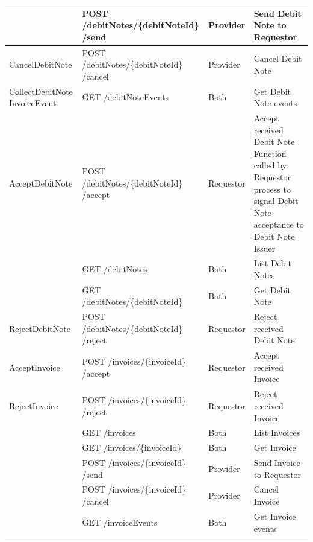 \begin{enumerate}
\begin{enumerate}
\begin{table}
\begin{center}
\begin{tabular}{|p{3cm}|p{7cm}|p{1.5cm}|p{4cm}|}
						& 	POST /debitNotes/\{debitNoteId\} /send		&	Provider 	&	Send Debit Note to Requestor \\
\hline

CancelDebitNote			&	POST /debitNotes/\{debitNoteId\} /cancel	&	Provider	&	Cancel Debit Note \\
\hline

CollectDebitNote \newline InvoiceEvent	&	GET /debitNoteEvents		&	Both		&	Get Debit Note events \\
\hline

AcceptDebitNote			&	POST /debitNotes/\{debitNoteId\} /accept	&	Requestor	&	Accept received Debit Note \newline
																							Function called by Requestor process to 
																							signal Debit Note acceptance to Debit Note Issuer \\
\hline

						& 	GET /debitNotes								&	Both		& 	List Debit Notes \\
\hline

						& 	GET /debitNotes/\{debitNoteId\}				&	Both 		&	Get Debit Note \\
\hline

RejectDebitNote			&	POST /debitNotes/\{debitNoteId\} /reject	&	Requestor	&	Reject received Debit Note \\
\hline

AcceptInvoice			&	POST /invoices/\{invoiceId\} /accept		&	Requestor 	&	Accept received Invoice \\
\hline

RejectInvoice			&	POST /invoices/\{invoiceId\} /reject		&	Requestor 	&	Reject received Invoice \\
\hline

						& 	GET /invoices 								&	Both		&	List Invoices \\
\hline

						&	GET /invoices/\{invoiceId\}					&	Both		& 	Get Invoice \\
\hline

						&	POST /invoices/\{invoiceId\} /send			&	Provider 	& 	Send Invoice to Requestor \\
\hline 

						&	POST /invoices/\{invoiceId\} /cancel		&	Provider 	& 	Cancel Invoice  \\
\hline

						&	GET /invoiceEvents							&	Both 		& 	Get Invoice events \\
\hline


\end{tabular}
\end{center}
\end{table}
\end{enumerate}
\end{enumerate}
